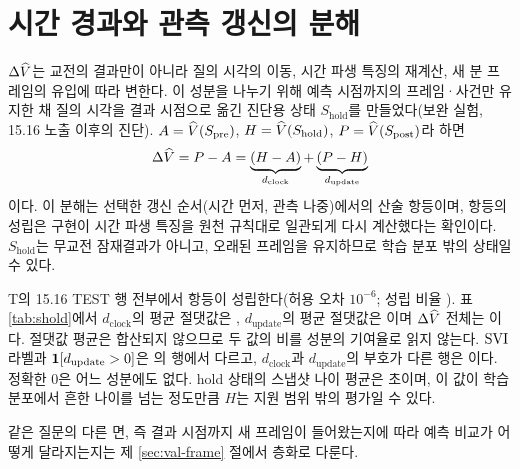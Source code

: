 \section{시간 경과와 관측 갱신의 분해}
\label{sec:value-shold}

$\Delta\widehat V$는 교전의 결과만이 아니라 질의 시각의 이동, 시간 파생 특징의 재계산, 새 분 프레임의 유입에 따라 변한다. 이 성분을 나누기 위해 예측 시점까지의 프레임·사건만 유지한 채 질의 시각을 결과 시점으로 옮긴 진단용 상태 $S_{\mathrm{hold}}$를 만들었다(보완 실험, 15.16 노출 이후의 진단). $A = \widehat V(S_{\mathrm{pre}})$, $H = \widehat V(S_{\mathrm{hold}})$, $P = \widehat V(S_{\mathrm{post}})$라 하면
\begin{equation}
  \Delta\widehat V = P - A = \underbrace{(H - A)}_{d_{\mathrm{clock}}} + \underbrace{(P - H)}_{d_{\mathrm{update}}}
  \label{eq:shold}
\end{equation}
이다. 이 분해는 선택한 갱신 순서(시간 먼저, 관측 나중)에서의 산술 항등이며, 항등의 성립은 구현이 시간 파생 특징을 원천 규칙대로 일관되게 다시 계산했다는 확인이다. $S_{\mathrm{hold}}$는 무교전 잠재결과가 아니고, 오래된 프레임을 유지하므로 학습 분포 밖의 상태일 수 있다.

T의 15.16 TEST \shN{} 행 전부에서 항등이 성립한다(허용 오차 $10^{-6}$; 성립 비율 \shIdentity{}). 표 \ref{tab:shold}에서 $d_{\mathrm{clock}}$의 평균 절댓값은 \shClockAbs{}, $d_{\mathrm{update}}$의 평균 절댓값은 \shUpdAbs{}이며 $\Delta\widehat V$ 전체는 \shDvAbs{}이다. 절댓값 평균은 합산되지 않으므로 두 값의 비를 성분의 기여율로 읽지 않는다. $\mathrm{SVI}$ 라벨과 $\mathbf{1}[d_{\mathrm{update}} > 0]$은 \shFlip{}의 행에서 다르고, $d_{\mathrm{clock}}$과 $d_{\mathrm{update}}$의 부호가 다른 행은 \shOpp{}이다. 정확한 0은 어느 성분에도 없다. hold 상태의 스냅샷 나이 평균은 \shHoldAge{}초이며, 이 값이 학습 분포에서 흔한 나이를 넘는 정도만큼 $H$는 지원 범위 밖의 평가일 수 있다.



같은 질문의 다른 면, 즉 결과 시점까지 새 프레임이 들어왔는지에 따라 예측 비교가 어떻게 달라지는지는 제 \ref{sec:val-frame} 절에서 층화로 다룬다.
